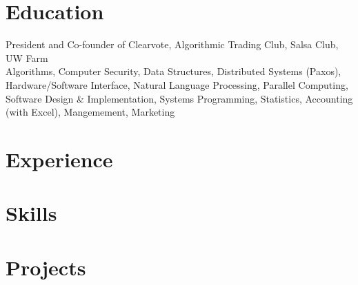 \documentclass[11pt,letterpaper]{article}
\begin{document}

\section{Education}

President and Co-founder of Clearvote, Algorithmic Trading Club, Salsa Club, UW Farm \\
Algorithms, Computer Security, Data Structures, Distributed Systems (Paxos), Hardware/Software
Interface, Natural Language Processing, Parallel Computing, Software Design \& Implementation, Systems Programming,
Statistics, Accounting (with Excel), Mangemement, Marketing \\

\section{Experience}





\section{Skills}


\section{Projects}




\end{document}
